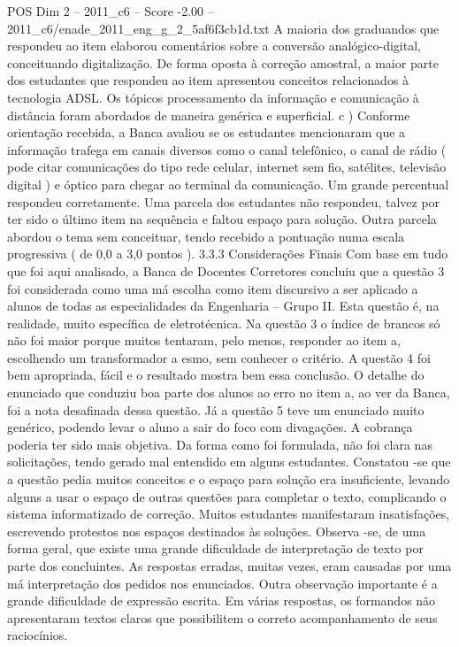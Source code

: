 \begin{textsample}{POS Dim 2 – 2011\_c6 – Score -2.00 – 2011\_c6/enade\_2011\_eng\_g\_2\_5af6f3cb1d.txt}
A maioria dos graduandos que respondeu ao item elaborou comentários sobre a conversão analógico-digital, conceituando digitalização.
De forma oposta à correção amostral, a maior parte dos estudantes que respondeu ao item apresentou conceitos relacionados à tecnologia ADSL.
Os tópicos processamento da informação e comunicação à distância foram abordados de maneira genérica e superficial. c ) Conforme orientação recebida, a Banca avaliou se os estudantes mencionaram que a informação trafega em canais diversos como o canal telefônico, o canal de rádio ( pode citar comunicações do tipo rede celular, internet sem fio, satélites, televisão digital ) e óptico para chegar ao terminal da comunicação.
Um grande percentual respondeu corretamente.
Uma parcela dos estudantes não respondeu, talvez por ter sido o último item na sequência e faltou espaço para solução.
Outra parcela abordou o tema sem conceituar, tendo recebido a pontuação numa escala progressiva ( de 0,0 a 3,0 pontos ). 3.3.3 Considerações Finais Com base em tudo que foi aqui analisado, a Banca de Docentes Corretores concluiu que a questão 3 foi considerada como uma má escolha como item discursivo a ser aplicado a alunos de todas as especialidades da Engenharia – Grupo II.
Esta questão é, na realidade, muito específica de eletrotécnica.
Na questão 3 o índice de brancos só não foi maior porque muitos tentaram, pelo menos, responder ao item a, escolhendo um transformador a esmo, sem conhecer o critério.
A questão 4 foi bem apropriada, fácil e o resultado mostra bem essa conclusão.
O detalhe do enunciado que conduziu boa parte dos alunos ao erro no item a, ao ver da Banca, foi a nota desafinada dessa questão.
Já a questão 5 teve um enunciado muito genérico, podendo levar o aluno a sair do foco com divagações.
A cobrança poderia ter sido mais objetiva.
Da forma como foi formulada, não foi clara nas solicitações, tendo gerado mal entendido em alguns estudantes.
Constatou -se que a questão pedia muitos conceitos e o espaço para solução era insuficiente, levando alguns a usar o espaço de outras questões para completar o texto, complicando o sistema informatizado de correção.
Muitos estudantes manifestaram insatisfações, escrevendo protestos nos espaços destinados às soluções.
Observa -se, de uma forma geral, que existe uma grande dificuldade de interpretação de texto por parte dos concluintes.
As respostas erradas, muitas vezes, eram causadas por uma má interpretação dos pedidos nos enunciados.
Outra observação importante é a grande dificuldade de expressão escrita.
Em várias respostas, os formandos não apresentaram textos claros que possibilitem o correto acompanhamento de seus raciocínios.

\end{textsample}
